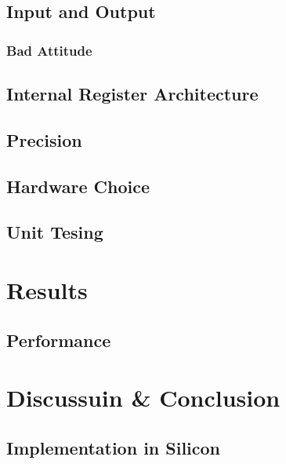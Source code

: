\documentclass[12pt]{article}
\begin{document}
        \subsection {Input and Output}
    
            \subsubsection {Bad Attitude}
    
        \subsection {Internal Register Architecture}
    
        \subsection{Precision}
    
        \subsection{Hardware Choice}
    
        \subsection{Unit Tesing}
    
    \section{Results}
    
        \subsection {Performance}
    
    \section{Discussuin \& Conclusion}
    
        \subsection{Implementation in Silicon}
\end{document}
